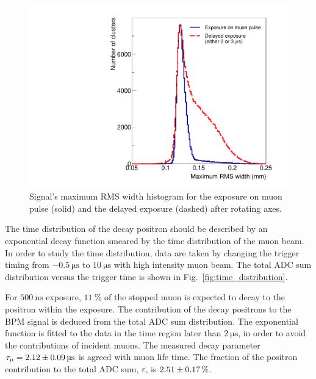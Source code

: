 \documentclass[preprint,3p,twocolumn]{elsarticle}
\begin{document}
\begin{figure}[tbp]
	\centering
	\includegraphics[width=\columnwidth]{figure/RMS_legend_v2.pdf}
	\caption{Signal's maximum RMS width histogram for the exposure on muon pulse (solid) and the delayed exposure (dashed) after rotating axes.}
	\label{fig:positron_width}
\end{figure}
The time distribution of the decay positron should be described by an exponential decay function smeared by the time distribution of the muon beam.
In order to study the time distribution, data are taken by changing the trigger timing from $\SI{-0.5}{\micro\s}$ to $\SI{10}{\micro\s}$ with high intensity muon beam. The total ADC sum distribution versus the trigger time is shown in Fig.~\ref{fig:time_distribution}.

For $\SI{500}{\nano\s}$ exposure, $\SI{11}{\percent}$ of the stopped muon is expected to decay to the positron within the exposure. The contribution of the decay positrons to the BPM signal is deduced from the total ADC sum distribution. The exponential function is fitted to the data in the time region later than $\SI{2}{\micro\s}$, in order to avoid the contributions of incident muons. The measured decay parameter $\tau_{\mu}=\SI{2.12 \pm 0.09}{\micro\s}$ is agreed with muon life time. The fraction of the positron contribution to the total ADC sum, $\varepsilon$, is $\SI{2.51\pm0.17}{\percent}$.
\end{document}
